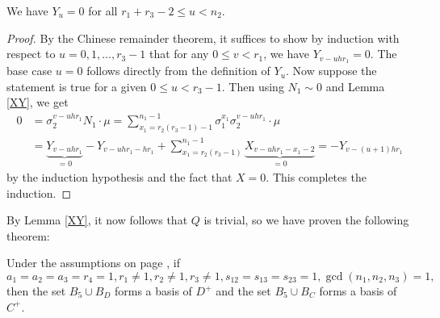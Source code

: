 \begin{cor}
We have $Y_u=0$ for all $r_1+r_3-2\leq u < n_2$.
\end{cor}
\begin{proof}
By the Chinese remainder theorem, it suffices to show by induction with respect to $u=0,1,\dots,r_3-1$ that for any $0\leq v<r_1$, we have $Y_{v-uhr_1}=0.$ The base case $u=0$ follows directly from the definition of $Y_u$. Now suppose the statement is true for a given $0\leq u<r_3-1$. Then using $N_1\sim 0$ and Lemma \ref{XY}, we get
\begin{align*}
0&=\sigma_2^{v-uhr_1} N_1 \cdot \mu=\sum_{x_1=r_2(r_3-1)-1}^{n_1-1}\sigma_1^{x_1}\sigma_2^{v-uhr_1}\cdot\mu\\
&=\underbrace{Y_{v-uhr_1}}_{=0}-Y_{v-uhr_1-hr_1}+\sum_{x_1=r_2(r_3-1)}^{n_1-1}\underbrace {X_{v-uhr_1-x_1-2}}_{=0}=-Y_{v-(u+1)hr_1}
\end{align*}
by the induction hypothesis and the fact that $X=0$. This completes the induction.
\end{proof}
\pagebreak
By Lemma \ref{XY}, it now follows that $Q$ is trivial, so we have proven the following theorem:
\begin{theorem}\label{th5}
Under the assumptions on page \pageref{assum}, if $$a_1=a_2=a_3=r_4=1, r_1\neq 1, r_2\neq 1, r_3 \neq 1,s_{12}=s_{13}=s_{23}=1,\gcd(n_1,n_2,n_3)=1,$$ then  the set $B_{5}\cup B_D$ forms a basis of $D^+$ and the set $B_{5}\cup B_C$ forms a basis of $C^+$.
\end{theorem}
